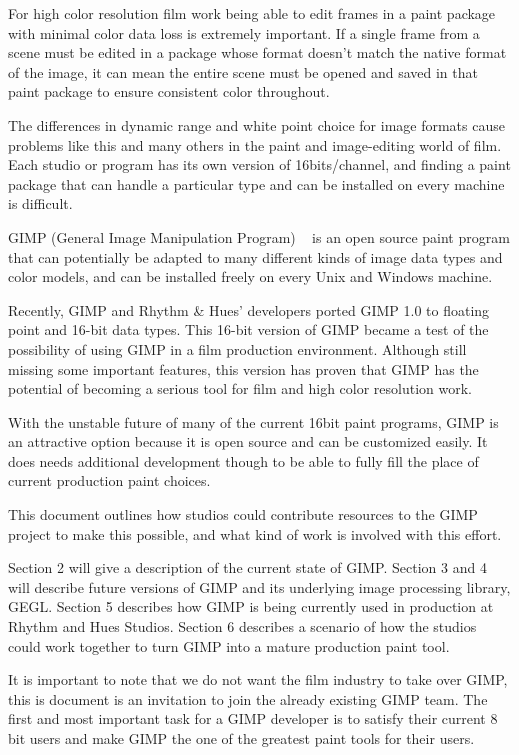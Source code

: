 
For high color resolution film work being able to edit frames in a paint
package with minimal color data loss is extremely important. If a single frame
from a scene must be edited in a package whose format doesn't match the native
format of the image, it can mean the entire scene must be opened and saved in
that paint package to ensure consistent color throughout.   

The differences in dynamic range and white point choice for image formats cause
problems like this and many others in the paint and image-editing world of film.
Each studio or program has its own version of 16bits/channel, and finding a
paint package that can handle a particular type and can be installed on every
machine is difficult.

GIMP (General Image Manipulation Program) ~\cite{gegl} is an open source paint program that
can potentially be adapted to many different kinds of image data types and
color models, and can be installed freely on every Unix and Windows machine. 

Recently, GIMP and Rhythm \& Hues' developers ported GIMP 1.0 to floating point
and 16-bit data types. This 16-bit version of GIMP became a test of the
possibility of using GIMP in a film production environment. Although still
missing some important features, this version has proven that GIMP has the
potential of becoming a serious tool for film and high color resolution work. 

With the unstable future of many of the current 16bit paint programs, GIMP is
an attractive option because it is open source and can be customized easily.
It does needs additional development though to be able to fully fill the place
of current production paint choices. 

This document outlines how studios could contribute resources to the GIMP
project to make this possible, and what kind of work is involved with this
effort.  

Section 2 will give a description of the current state of GIMP. Section 3
and 4 will describe future versions of GIMP and its underlying image processing
library, GEGL. Section 5 describes how GIMP is being currently used in
production at Rhythm and Hues Studios. Section 6 describes a scenario of how
the studios could work together to turn GIMP into a mature production paint
tool.

It is important to note that we do not want the film industry to take over GIMP, this is document is an invitation to join the already existing GIMP team. The first and most important task for a GIMP developer is to satisfy their current 8 bit users and make GIMP the one of the greatest paint tools for their users.


